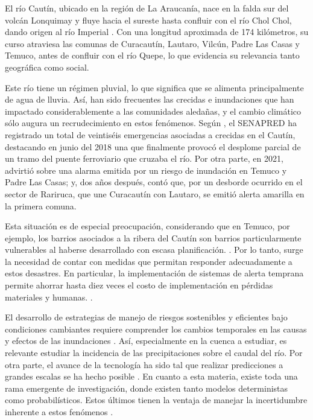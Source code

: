 \documentclass[hess, manuscript]{copernicus}
\begin{document}

\introduction  %
\label{sec:Introduction}

El río Cautín, ubicado en la región de La Araucanía, nace en la falda sur del volcán Lonquimay y fluye hacia el sureste hasta confluir con el río Chol Chol, dando origen al río Imperial \citep{richard_cerda_respuesta_2014}. Con una longitud aproximada de 174 kilómetros, su curso atraviesa las comunas de Curacautín, Lautaro, Vilcún, Padre Las Casas y Temuco, antes de confluir con el río Quepe, lo que evidencia su relevancia tanto geográfica como social.

Este río tiene un régimen pluvial, lo que significa que se alimenta principalmente de agua de lluvia. Así, han sido frecuentes las crecidas e inundaciones que han impactado considerablemente a las comunidades aledañas, y el cambio climático sólo augura un recrudecimiento en estos fenómenos. Según \citet{padilla_turra_registros_2024}, el SENAPRED ha registrado un total de veintiséis emergencias asociadas a crecidas en el Cautín, destacando en junio del 2018 una que finalmente provocó el desplome parcial de un tramo del puente ferroviario que cruzaba el río. Por otra parte, en 2021, \citet{el_mostrador_intendencia_2021} advirtió sobre una alarma emitida por un riesgo de inundación en Temuco y Padre Las Casas; y, dos años después, \citet{mennickent_barros_desbordes_2023} contó que, por un desborde ocurrido en el sector de Rariruca, que une Curacautín con Lautaro, se emitió alerta amarilla en la primera comuna.

Esta situación es de especial preocupación, considerando que en Temuco, por ejemplo, los barrios asociados a la ribera del Cautín son barrios particularmente vulnerables al haberse desarrollado con escasa planificación. \citep{acuna_munoz_volver_2020}. Por lo tanto, surge la necesidad de contar con medidas que permitan responder adecuadamente a estos desastres. En particular, la implementación de sistemas de alerta temprana permite ahorrar hasta diez veces el costo de implementación en pérdidas materiales y humanas. \citep{global_commission_on_adaptation_adapt_nodate}.

El desarrollo de estrategias de manejo de riesgos sostenibles y eficientes bajo condiciones cambiantes requiere comprender los cambios temporales en las causas y efectos de las inundaciones \citep{kreibich_panta_2023}. Así, especialmente en la cuenca a estudiar, es relevante estudiar la incidencia de las precipitaciones sobre el caudal del río. Por otra parte, el avance de la tecnología ha sido tal que realizar predicciones a grandes escalas se ha hecho posible \citep{arnal_towards_2025}. En cuanto a esta materia, existe toda una rama emergente de investigación, donde existen tanto modelos deterministas como probabilísticos. Estos últimos tienen la ventaja de manejar la incertidumbre inherente a estos fenómenos \citep{wakai_historical_2025}.
\end{document}
